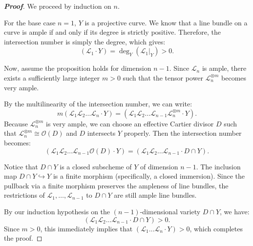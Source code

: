 \begin{proof}[\textbf{Proof}]
We proceed by induction on $n$. 

For the base case $n=1$, $Y$ is a projective curve. We know that a line bundle on a curve is ample if and only if its degree is strictly positive. Therefore, the intersection number is simply the degree, which gives:
\[
(\mathcal{L}_1 \cdot Y) = \deg_Y(\mathcal{L}_1|_Y) > 0.
\]

Now, assume the proposition holds for dimension $n-1$. Since $\mathcal{L}_n$ is ample, there exists a sufficiently large integer $m > 0$ such that the tensor power $\mathcal{L}_n^{\otimes m}$ becomes very ample. 

By the multilinearity of the intersection number, we can write:
\[
m(\mathcal{L}_1 \mathcal{L}_2 \dots \mathcal{L}_n \cdot Y) = (\mathcal{L}_1 \mathcal{L}_2 \dots \mathcal{L}_{n-1} \mathcal{L}_n^{\otimes m} \cdot Y).
\]
Because $\mathcal{L}_n^{\otimes m}$ is very ample, we can choose an effective Cartier divisor $D$ such that $\mathcal{L}_n^{\otimes m} \cong \mathcal{O}(D)$ and $D$ intersects $Y$ properly. Then the intersection number becomes:
\[
(\mathcal{L}_1 \mathcal{L}_2 \dots \mathcal{L}_{n-1} \mathcal{O}(D) \cdot Y) = (\mathcal{L}_1 \mathcal{L}_2 \dots \mathcal{L}_{n-1} \cdot D \cap Y).
\]

Notice that $D \cap Y$ is a closed subscheme of $Y$ of dimension $n-1$. The inclusion map $D \cap Y \hookrightarrow Y$ is a finite morphism (specifically, a closed immersion). Since the pullback via a finite morphism preserves the ampleness of line bundles, the restrictions of $\mathcal{L}_1, \dots, \mathcal{L}_{n-1}$ to $D \cap Y$ are still ample line bundles.

By our induction hypothesis on the $(n-1)$-dimensional variety $D \cap Y$, we have:
\[
(\mathcal{L}_1 \mathcal{L}_2 \dots \mathcal{L}_{n-1} \cdot D \cap Y) > 0.
\]
Since $m > 0$, this immediately implies that $(\mathcal{L}_1 \dots \mathcal{L}_n \cdot Y) > 0$, which completes the proof.
\end{proof}